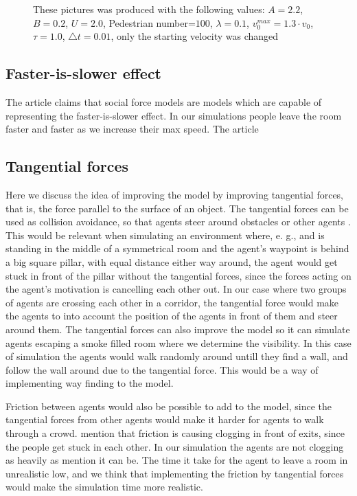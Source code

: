 \begin{figure}
\caption{These pictures was produced with the following values: $A=2.2$, $B=0.2$, $U=2.0$, Pedestrian number=$100$, $\lambda=0.1$, $v^{max}_0=1.3 \cdot v_0$, $\tau = 1.0$, $\triangle t = 0.01$, only the starting velocity was changed}
\label{fig:problemSenario}
\end{figure}
\subsection{Faster-is-slower effect}
The article \cite{self-org} claims that social force models are models which are capable of representing the faster-is-slower effect. In our simulations people leave the room faster and faster as we increase their max speed. The article 

\subsection{Tangential forces}
Here we discuss the idea of improving the model by improving tangential forces, that is, the force parallel to the surface of an object.
The tangential forces can be used as collision avoidance, so that agents steer around obstacles or other agents \cite{tang}.
This would be relevant when simulating an environment where, e. g., and is standing in the middle of a symmetrical room and the agent's waypoint
is behind a big square pillar, with equal distance either way around, the agent would get stuck in front of the pillar without the tangential forces,
since the forces acting on the agent's motivation is cancelling each other out. 
In our case where two groups of agents are crossing each other in a corridor, the tangential force would make the agents to into account
the position of the agents in front of them and steer around them.
The tangential forces can also improve the model so it can simulate agents escaping a smoke filled room where we determine the visibility.
In this case of simulation the agents would walk randomly around untill they find a wall, and follow the wall around due to the tangential force.
This would be a way of implementing way finding to the model.

Friction between agents would also be possible to add to the model, since the tangential forces from other agents would make it
harder for agents to walk through a crowd. \cite{self-org} mention that friction is causing clogging in front of exits, since the people
get stuck in each other. In our simulation the agents are not clogging as heavily as \cite{self-org} mention it can be.
The time it take for the agent to leave a room in unrealistic low, and we think that implementing the friction by tangential forces
would make the simulation time more realistic.
